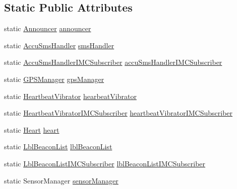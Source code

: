 \subsection*{Static Public Attributes}
\begin{DoxyCompactItemize}
\item 
static \hyperlink{classpt_1_1lsts_1_1asa_1_1comms_1_1Announcer}{Announcer} \hyperlink{classpt_1_1lsts_1_1asa_1_1ASA_a09a7fbc6fa8123eaea605bbece39554b}{announcer}
\item 
static \hyperlink{classpt_1_1lsts_1_1asa_1_1handlers_1_1AccuSmsHandler}{Accu\+Sms\+Handler} \hyperlink{classpt_1_1lsts_1_1asa_1_1ASA_aa2a2cd288c2a2634632735baa0bf5a6b}{sms\+Handler}
\item 
static \hyperlink{classpt_1_1lsts_1_1asa_1_1subscribers_1_1AccuSmsHandlerIMCSubscriber}{Accu\+Sms\+Handler\+I\+M\+C\+Subscriber} \hyperlink{classpt_1_1lsts_1_1asa_1_1ASA_ad6e77863d43fd469324d4e5afb8e8a4e}{accu\+Sms\+Handler\+I\+M\+C\+Subscriber}
\item 
static \hyperlink{classpt_1_1lsts_1_1asa_1_1managers_1_1GPSManager}{G\+P\+S\+Manager} \hyperlink{classpt_1_1lsts_1_1asa_1_1ASA_a3231592629454d15eb368a68b7c59ddd}{gps\+Manager}
\item 
static \hyperlink{classpt_1_1lsts_1_1asa_1_1feedback_1_1HeartbeatVibrator}{Heartbeat\+Vibrator} \hyperlink{classpt_1_1lsts_1_1asa_1_1ASA_a96229d228ceec5d091b7376cf8b1af53}{hearbeat\+Vibrator}
\item 
static \hyperlink{classpt_1_1lsts_1_1asa_1_1subscribers_1_1HeartbeatVibratorIMCSubscriber}{Heartbeat\+Vibrator\+I\+M\+C\+Subscriber} \hyperlink{classpt_1_1lsts_1_1asa_1_1ASA_a04225cde8a01f7dc651d6af1bd154545}{heartbeat\+Vibrator\+I\+M\+C\+Subscriber}
\item 
static \hyperlink{classpt_1_1lsts_1_1asa_1_1feedback_1_1Heart}{Heart} \hyperlink{classpt_1_1lsts_1_1asa_1_1ASA_a3c881b1e93731bb07899672e80d503f3}{heart}
\item 
static \hyperlink{classpt_1_1lsts_1_1asa_1_1pos_1_1LblBeaconList}{Lbl\+Beacon\+List} \hyperlink{classpt_1_1lsts_1_1asa_1_1ASA_ae16acaf6a366616f9d7b7487666f030e}{lbl\+Beacon\+List}
\item 
static \hyperlink{classpt_1_1lsts_1_1asa_1_1subscribers_1_1LblBeaconListIMCSubscriber}{Lbl\+Beacon\+List\+I\+M\+C\+Subscriber} \hyperlink{classpt_1_1lsts_1_1asa_1_1ASA_aa2b1a5f76f5a080ba4e4f3d4f2e83a3c}{lbl\+Beacon\+List\+I\+M\+C\+Subscriber}
\item 
static Sensor\+Manager \hyperlink{classpt_1_1lsts_1_1asa_1_1ASA_a4eb3c4a73c2c1631c94574384f6323e2}{sensor\+Manager}
\end{DoxyCompactItemize}
